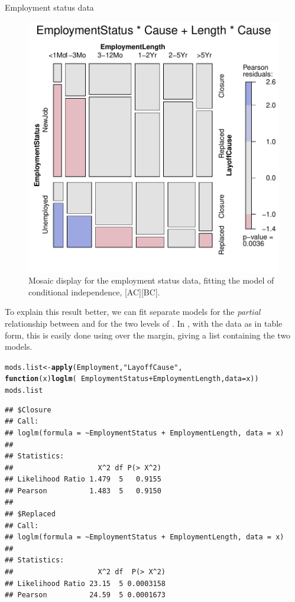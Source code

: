\documentclass[11pt]{book}\usepackage[]{graphicx}\usepackage[]{color}
\makeatletter
\newcommand{\hlstr}[1]{\textcolor[rgb]{0.192,0.494,0.8}{#1}}%
\newcommand{\hlopt}[1]{\textcolor[rgb]{0,0,0}{#1}}%
\newcommand{\hlstd}[1]{\textcolor[rgb]{0.345,0.345,0.345}{#1}}%
\newcommand{\hlkwa}[1]{\textcolor[rgb]{0.161,0.373,0.58}{\textbf{#1}}}%
\newcommand{\hlkwb}[1]{\textcolor[rgb]{0.69,0.353,0.396}{#1}}%
\newcommand{\hlkwc}[1]{\textcolor[rgb]{0.333,0.667,0.333}{#1}}%
\newcommand{\hlkwd}[1]{\textcolor[rgb]{0.737,0.353,0.396}{\textbf{#1}}}%
\newenvironment{kframe}{%
 \def\at@end@of@kframe{}%
 \ifinner\ifhmode%
  \def\at@end@of@kframe{\end{minipage}}%
  \begin{minipage}{\columnwidth}%
 \fi\fi%
 \def\FrameCommand##1{\hskip\@totalleftmargin \hskip-\fboxsep
 \colorbox{shadecolor}{##1}\hskip-\fboxsep
     \hskip-\linewidth \hskip-\@totalleftmargin \hskip\columnwidth}%
 \MakeFramed {\advance\hsize-\width
   \@totalleftmargin\z@ \linewidth\hsize
   \@setminipage}}%
 {\par\unskip\endMakeFramed%
 \at@end@of@kframe}
\newenvironment{knitrout}{}{} %
\renewenvironment{knitrout}{\small\renewcommand{\baselinestretch}{.85}}{} %
\makeatother
\begin{document}
\begin{Example}[employ]{Employment status data}
\begin{knitrout}
\begin{figure}[htbp]
\centerline{\includegraphics[width=.6\textwidth]{ch05/fig/employ-mos2} }

\caption[Mosaic display for the employment status data, fitting the model of conditional independence]{Mosaic display for the employment status data, fitting the model of conditional independence, [AC][BC].\label{fig:employ-mos2}}
\end{figure}


\end{knitrout}


To explain this result better, we can fit separate models for the \emph{partial}
relationship between  and 
for the two levels of . In \R, with the  data
as in table form, this is easily done using  over the 
 margin, giving a list containing the two  models.

\begin{knitrout}
\color{fgcolor}\begin{kframe}
\begin{alltt}
\hlstd{mods.list} \hlkwb{<-} \hlkwd{apply}\hlstd{(Employment,} \hlstr{"LayoffCause"}\hlstd{,}
                   \hlkwa{function}\hlstd{(}\hlkwc{x}\hlstd{)} \hlkwd{loglm}\hlstd{(}\hlopt{~}\hlstd{EmploymentStatus} \hlopt{+} \hlstd{EmploymentLength,} \hlkwc{data}\hlstd{=x))}
\hlstd{mods.list}
\end{alltt}
\begin{verbatim}
## $Closure
## Call:
## loglm(formula = ~EmploymentStatus + EmploymentLength, data = x)
## 
## Statistics:
##                    X^2 df P(> X^2)
## Likelihood Ratio 1.479  5   0.9155
## Pearson          1.483  5   0.9150
## 
## $Replaced
## Call:
## loglm(formula = ~EmploymentStatus + EmploymentLength, data = x)
## 
## Statistics:
##                    X^2 df  P(> X^2)
## Likelihood Ratio 23.15  5 0.0003158
## Pearson          24.59  5 0.0001673
\end{verbatim}
\end{kframe}
\end{knitrout}


\end{Example}
\end{document}
